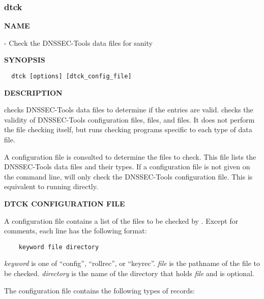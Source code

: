 \clearpage

\subsubsection{dtck}

{\bf NAME}

 - Check the DNSSEC-Tools data files for sanity

{\bf SYNOPSIS}

\begin{verbatim}
  dtck [options] [dtck_config_file]
\end{verbatim}

{\bf DESCRIPTION}

 checks DNSSEC-Tools data files to determine if the entries are
valid.   checks the validity of DNSSEC-Tools configuration files,
 files, and  files.  It does not perform the
file checking itself, but runs checking programs specific to each type of
data file.

A  configuration file is consulted to determine the files to check.
This file lists the DNSSEC-Tools data files and their types.  If a 
configuration file is not given on the command line,  will only
check the DNSSEC-Tools configuration file.  This is equivalent to running
 directly.

{\bf DTCK CONFIGURATION FILE}

A  configuration file contains a list of the files to be checked by
.  Except for comments, each line has the following format:

\begin{verbatim}
    keyword file directory
\end{verbatim}

{\it keyword} is one of ``config'', ``rollrec'', or ``keyrec''.
{\it file} is the pathname of the file to be checked.
{\it directory} is the name of the directory that holds {\it file} and is
optional.

The  configuration file contains the following types of records:

